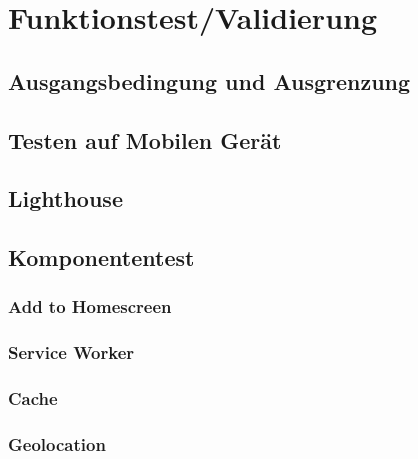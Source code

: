 \chapter{Funktionstest/Validierung}\label{chap:Funktionstest}
\thispagestyle{standard}
\pagestyle{standard}

\section{Ausgangsbedingung und Ausgrenzung}


\section{Testen auf Mobilen Gerät}

\section{Lighthouse}

\section{Komponententest}



\subsection{Add to Homescreen}



\subsection{Service Worker}



\subsection{Cache}



\subsection{Geolocation}




